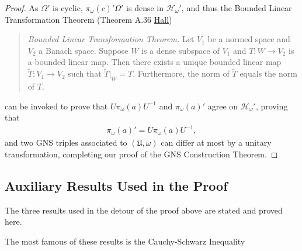 \begin{proof}
As $\Omega'$ is cyclic, $\pi_\omega(c)'\Omega'$ is dense in $\mathcal{H}_\omega'$, and thus the  Bounded Linear Transformation Theorem (Theorem A.36 \href{https://doi.org/10.1007/978-1-4614-7116-5}{Hall})

\begin{quote}
    \textit{Bounded Linear Transformation Theorem.} Let $V_1$ be a normed space and $V_2$ a Banach space. Suppose $W$ is a dense subspace of $V_1$ and $T: W \rightarrow V_2$ is a bounded linear map. Then there exists a unique bounded linear map $\widetilde{T}: V_1 \rightarrow V_2$ such that $\widetilde{T}|_W = T$. Furthermore, the norm of $\widetilde{T}$ equals the norm of $T$.
\end{quote}

\noindent can be invoked to prove that $U\pi_\omega(a)U^{-1}$ and $\pi_\omega(a)'$ agree on $\mathcal{H}_\omega'$, proving that
\begin{align}
    \pi_\omega(a)' = U\pi_\omega(a)U^{-1},
\end{align}
and two GNS triples associated to $(\mathfrak{U}, \omega)$ can differ at most by a unitary transformation, completing our proof of the GNS Construction Theorem.
\end{proof}

\subsection{Auxiliary Results Used in the Proof}
The three results used in the detour of the proof above are stated and proved here.

The most famous of these results is the Cauchy-Schwarz Inequality


